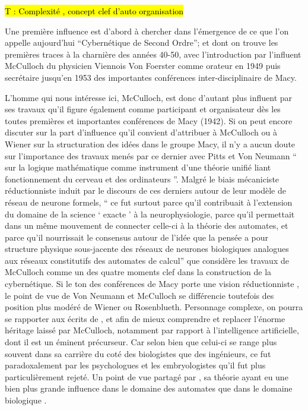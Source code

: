 \hl{T : Complexité , concept clef d'auto organisation } 

Une première influence est d'abord à chercher dans l'émergence de ce que l'on appelle aujourd'hui \enquote{Cybernétique de Second Ordre}; et dont on trouve les premières traces à la charnière des années 40-50, avec l'introduction par l'influent McCulloch du physicien Viennois Von Foerster comme orateur en 1949 puis secrétaire jusqu'en 1953 des importantes conférences inter-disciplinaire de Macy. 

L'homme qui nous intéresse ici, McCulloch, est donc d'autant plus influent par ses travaux qu'il figure également comme participant et organisateur dès les toutes premières et importantes conférences de Macy (1942). Si on peut encore discuter sur la part d'influence qu'il convient d'attribuer à McCulloch ou à Wiener sur la structuration des idées dans le groupe Macy, il n'y a aucun doute sur l'importance des travaux menés par ce dernier avec Pitts et Von Neumann \enquote{ sur la logique mathématique comme instrument d'une théorie unifié liant fonctionnement du cerveau et des ordinateurs }. Malgré le biais mécaniciste réductionniste \textcite[783-784]{Pouvreau2013} induit par le discours de ces derniers autour de leur modèle de réseau de neurone formels, \enquote{ ce fut surtout parce qu’il contribuait à l’extension du domaine de la science \enquote{ exacte } à la neurophysiologie, parce qu’il permettait dans un même mouvement de connecter celle-ci à la théorie des automates, et parce qu’il nourrissait le consensus autour de l’idée que la pensée a pour structure physique sous-jacente des réseaux de neurones biologiques analogues aux réseaux constitutifs des automates de calcul} que \autocite[777]{Pouvreau2013} considère les travaux de McCulloch comme un des quatre moments clef dans la construction de la cybernétique. Si le ton des conférences de Macy porte une vision réductionniste , le point de vue de Von Neumann et McCulloch se différencie toutefois des position plus modéré de Wiener ou Rosenblueth. Personnage complexe, on pourra se rapporter aux écrits de \textcite{Dupuy2005}, et \textcite{Levy1985} afin de mieux comprendre et replacer l'énorme héritage laissé par McCulloch, notamment par rapport à l'intelligence artificielle, dont il est un éminent précurseur. Car selon \textcite{Dupuy2005} bien que celui-ci se range plus souvent dans sa carrière du coté des biologistes que des ingénieurs, ce fut paradoxalement par les psychologues et les embryologistes qu'il fut plus particulièrement rejeté. Un point de vue partagé par \textcite[778]{Pouvreau2013}, sa théorie ayant eu une bien plus grande influence dans le domaine des automates que dans le domaine biologique . 

